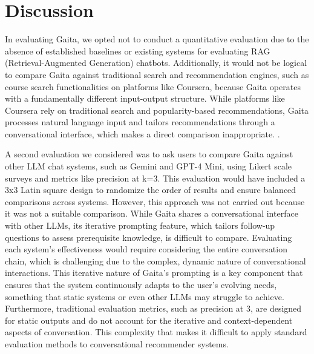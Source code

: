 \chapter{Discussion} \label{chap:chap-6}

In evaluating Gaita, we opted not to conduct a quantitative evaluation due to the absence of established baselines or existing systems for evaluating RAG (Retrieval-Augmented Generation) chatbots. Additionally, it would not be logical to compare Gaita against traditional search and recommendation engines, such as course search functionalities on platforms like Coursera, because Gaita operates with a fundamentally different input-output structure. While platforms like Coursera rely on traditional search and popularity-based recommendations, Gaita processes natural language input and tailors recommendations through a conversational interface, which makes a direct comparison inappropriate. \footnotemark[1].

A second evaluation we considered was to ask users to compare Gaita against other LLM chat systems, such as Gemini and GPT-4 Mini, using Likert scale surveys and metrics like precision at k=3. This evaluation would have included a 3x3 Latin square design to randomize the order of results and ensure balanced comparisons across systems. However, this approach was not carried out because it was not a suitable comparison. While Gaita shares a conversational interface with other LLMs, its iterative prompting feature, which tailors follow-up questions to assess prerequisite knowledge, is difficult to compare. Evaluating each system’s effectiveness would require considering the entire conversation chain, which is challenging due to the complex, dynamic nature of conversational interactions. This iterative nature of Gaita’s prompting is a key component that ensures that the system continuously adapts to the user’s evolving needs, something that static systems or even other LLMs may struggle to achieve. Furthermore, traditional evaluation metrics, such as precision at 3, are designed for static outputs and do not account for the iterative and context-dependent aspects of conversation. This complexity that makes it difficult to apply standard evaluation methods to conversational recommender systems. 

